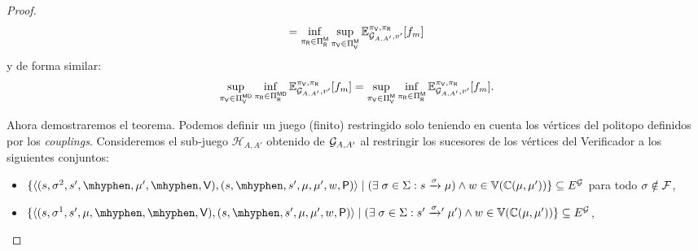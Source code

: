 \begin{proof}
\[    =  \inf_{\pi_{\mathsf{R}} \in \Pi_{\mathsf{R}}^{\mathsf{M}}}  \sup_{\pi_{\mathsf{V}} \in \Pi_{\mathsf{V}}^{\mathsf{M}}} \mathbb{E}_{\mathcal{G}_{A,A'},v'}^{\pi_{\mathsf{V}},\pi_{\mathsf{R}}}[f_{m}]
\]
y de forma similar:
\[
    \sup_{\pi_{\mathsf{V}} \in \Pi_{\mathsf{V}}^{\mathsf{M}\mathsf{D}}}  \inf_{\pi_{\mathsf{R}} \in \Pi_{\mathsf{R}}^{\mathsf{M}\mathsf{D}}} \mathbb{E}_{\mathcal{G}_{A,A'},v'}^{\pi_{\mathsf{V}},\pi_{\mathsf{R}}}[f_{m}] 
    =  \sup_{\pi_{\mathsf{V}} \in \Pi_{\mathsf{V}}^{\mathsf{M}}}  \inf_{\pi_{\mathsf{R}} \in \Pi_{\mathsf{R}}^{\mathsf{M}}} \mathbb{E}_{\mathcal{G}_{A,A'},v'}^{\pi_{\mathsf{V}},\pi_{\mathsf{R}}}[f_{m}].
\]

    Ahora demostraremos el teorema.  Podemos definir un juego (finito) restringido solo teniendo en cuenta los vértices del politopo definidos por los \emph{couplings}.  Consideremos el sub-juego $\mathcal{H}_{A,A'}$ obtenido de $\mathcal{G}_{A,A'}$ al restringir los sucesores de los vértices del Verificador a los siguientes conjuntos:
\begin{itemize}
	\item $\{ \langle (s, \sigma^2, s', \mhyphen, \mu', \mhyphen, \Verifier), (s, \mhyphen, s', \mu, \mu', w, \Probabilistic) \rangle \mid (\exists\;\sigma \in \Sigma: s \xrightarrow{\sigma} \mu) \wedge   w \in \vertices{\couplings{\mu}{\mu'}}\} \subseteq E^\StochG$ para todo $\sigma \notin \mathcal{F}$,

 	 \item $\{ \langle (s, \sigma^1, s', \mu, \mhyphen, \mhyphen, \Verifier),(s, \mhyphen, s', \mu, \mu', w, \Probabilistic) \rangle \mid (\exists\;\sigma \in \Sigma: s' \xrightarrowprime{\sigma} \mu' ) \wedge  w \in \vertices{\couplings{\mu}{\mu'}} \} \subseteq E^\StochG$,
	 

\end{itemize}
\end{proof}
